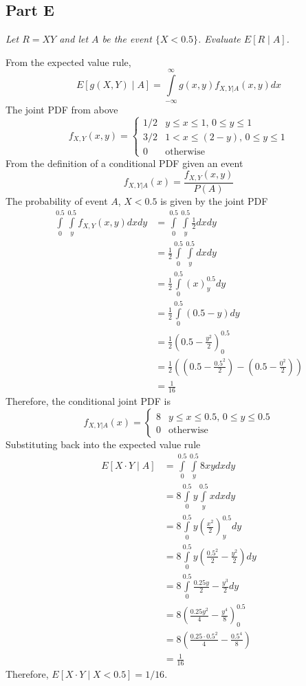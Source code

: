 \documentclass{article}
\begin{document}
\subsection*{Part E}

\textit{Let $ R = XY $ and let $A$ be the event $ \{ X < 0.5 \} $. Evaluate $
E[R \mid A] $.}

\bigbreak

From the expected value rule,
$$ E[g(X,Y) \mid A] = \int\limits_{-\infty}^{\infty} g(x, y) f_{X,Y|A}(x, y)
dx $$
The joint PDF from above
$$ f_{X,Y}(x,y) = \begin{cases}
    1/2 & y \leq x \leq 1,\, 0 \leq y \leq 1 \\
    3/2 & 1 < x \leq (2 - y),\, 0 \leq y \leq 1 \\
    0 & \mathrm{otherwise}
\end{cases} $$
From the definition of a conditional PDF given an event
$$ f_{X,Y|A}(x) = \frac{f_{X,Y}(x,y)}{P(A)} $$
The probability of event $A$, $ X < 0.5 $ is given by the joint PDF
\begin{align*}
    \int\limits_0^{0.5}\int\limits_y^{0.5} f_{X,Y}(x,y) dx dy &= \int\limits_0^{0.5}\int\limits_y^{0.5} \frac{1}{2} dx dy \\
    &= \frac{1}{2} \int\limits_0^{0.5} \int\limits_y^{0.5} dx dy \\
    &= \frac{1}{2} \int\limits_0^{0.5} \left(x \right)_y^{0.5} dy \\
    &= \frac{1}{2} \int\limits_0^{0.5} \left(0.5 - y \right) dy \\
    &= \frac{1}{2} \left(0.5 - \frac{y^2}{2} \right)_0^{0.5} \\
    &= \frac{1}{2} \left(\left(0.5 - \frac{0.5^2}{2}\right) - \left(0.5 - \frac{0^2}{2}\right) \right) \\
    &= \frac{1}{16}
\end{align*}
Therefore, the conditional joint PDF is 
$$ f_{X,Y|A}(x) = \begin{cases}
    8 & y \leq x \leq 0.5,\, 0 \leq y \leq 0.5 \\
    0 & \mathrm{otherwise}
\end{cases} $$
Substituting back into the expected value rule
\begin{align*}
    E[X \cdot Y \mid A] &= \int\limits_{0}^{0.5}\int\limits_y^{0.5} 8 x y dx dy \\
    &= 8 \int\limits_0^{0.5} y \int\limits_y^{0.5} x dx dy \\
    &= 8 \int\limits_0^{0.5} y \left(\frac{x^2}{2} \right)_y^{0.5} dy \\
    &= 8 \int\limits_0^{0.5} y \left(\frac{0.5^2}{2} - \frac{y^2}{2} \right) dy \\
    &= 8 \int\limits_0^{0.5} \frac{0.25 y}{2} - \frac{y^3}{2} dy \\
    &= 8 \left(\frac{0.25 y^2}{4} - \frac{y^4}{8} \right)_0^{0.5} \\
    &= 8 \left(\frac{0.25 \cdot 0.5^2}{4} - \frac{0.5^4}{8} \right) \\
    &= \frac{1}{16}
\end{align*}
Therefore, $ E[X\cdot Y \mid X < 0.5] = 1 / 16 $.
\end{document}
